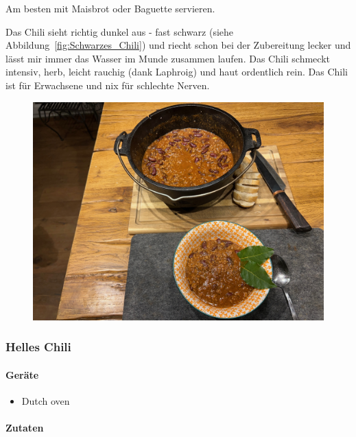 Am besten mit Maisbrot oder Baguette servieren.

Das Chili sieht richtig dunkel aus - fast schwarz (siehe 
Abbildung~\vref{fig:Schwarzes_Chili}) und riecht schon bei der Zubereitung 
lecker und lässt mir immer das Wasser im Munde zusammen laufen. Das Chili 
schmeckt intensiv, herb, leicht rauchig (dank Laphroig) und haut ordentlich 
rein. Das Chili ist für Erwachsene und nix für schlechte Nerven.
\newpage

\begin{figure}[htbp]
	\centering
	\begin{minipage}{1\textwidth}
		\centering
		\includegraphics[width=.9\linewidth]{pics/Schwarzes Chili}
		\label{fig:Schwarzes_Chili}
	\end{minipage}
\end{figure}
\newpage


\subsubsection{Helles Chili}\label{Helles Chili}

\paragraph{Geräte}

\begin{itemize}[noitemsep]
	\item Dutch oven
\end{itemize}

\paragraph{Zutaten}

